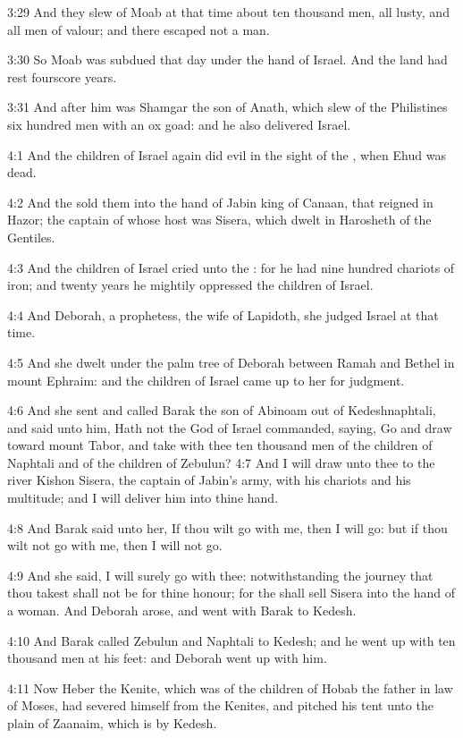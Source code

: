 3:29 And they slew of Moab at that time about ten thousand men, all
lusty, and all men of valour; and there escaped not a man.

3:30 So Moab was subdued that day under the hand of Israel. And the
land had rest fourscore years.

3:31 And after him was Shamgar the son of Anath, which slew of the
Philistines six hundred men with an ox goad: and he also delivered
Israel.

4:1 And the children of Israel again did evil in the sight of the
\LORD, when Ehud was dead.

4:2 And the \LORD sold them into the hand of Jabin king of Canaan, that
reigned in Hazor; the captain of whose host was Sisera, which dwelt in
Harosheth of the Gentiles.

4:3 And the children of Israel cried unto the \LORD: for he had nine
hundred chariots of iron; and twenty years he mightily oppressed the
children of Israel.

4:4 And Deborah, a prophetess, the wife of Lapidoth, she judged Israel
at that time.

4:5 And she dwelt under the palm tree of Deborah between Ramah and
Bethel in mount Ephraim: and the children of Israel came up to her for
judgment.

4:6 And she sent and called Barak the son of Abinoam out of
Kedeshnaphtali, and said unto him, Hath not the \LORD God of Israel
commanded, saying, Go and draw toward mount Tabor, and take with thee
ten thousand men of the children of Naphtali and of the children of
Zebulun?  4:7 And I will draw unto thee to the river Kishon Sisera,
the captain of Jabin's army, with his chariots and his multitude; and
I will deliver him into thine hand.

4:8 And Barak said unto her, If thou wilt go with me, then I will go:
but if thou wilt not go with me, then I will not go.

4:9 And she said, I will surely go with thee: notwithstanding the
journey that thou takest shall not be for thine honour; for the \LORD
shall sell Sisera into the hand of a woman. And Deborah arose, and
went with Barak to Kedesh.

4:10 And Barak called Zebulun and Naphtali to Kedesh; and he went up
with ten thousand men at his feet: and Deborah went up with him.

4:11 Now Heber the Kenite, which was of the children of Hobab the
father in law of Moses, had severed himself from the Kenites, and
pitched his tent unto the plain of Zaanaim, which is by Kedesh.

